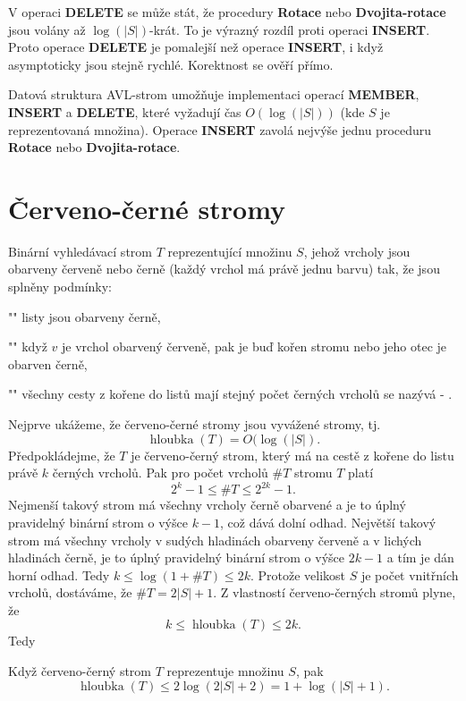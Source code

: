\documentclass[a4paper,12pt]{article}
\def \emph#1{\underbar{#1}}
\DeclareMathOperator*{\hloubka}{hloubka}
\begin{document}
V operaci {\bf DELETE} se může stát, že procedury 
{\bf Rotace} nebo {\bf Dvojita-rotace} jsou volány až $\log(
|S|)$-krát. 
To je výrazný rozdíl proti operaci {\bf INSERT}. Proto operace 
{\bf DELETE} je pomalejší než operace {\bf INSERT}, i když 
asymptoticky jsou stejně rychlé. Korektnost se 
ověří přímo.

Datová struktura AVL-strom 
umožňuje implementaci operací {\bf MEMBER}, {\bf INSERT} a 
{\bf DELETE}, které vyžadují čas $O(\log(|S|))$ (kde $
S$ je 
reprezentovaná množina).  Ope\-race {\bf INSERT} zavolá 
nejvýše jednu proceduru {\bf Rotace} nebo {\bf Dvo\-ji\-ta-rotace}.  
\endproclaim

\section{Červeno-černé stromy}

Binární vyhledávací strom $T$ reprezentující 
množinu $S$, jehož vrcholy jsou obarveny červeně nebo 
černě (každý vrchol má právě jednu barvu) tak, že jsou 
splněny podmínky:
\roster
\item"{}"
listy jsou obarveny černě,
\item"{}"
když $v$ je vrchol obarvený červeně, pak je buď kořen 
stromu nebo jeho otec je obarven černě,
\item"{}"
všechny cesty z kořene do listů mají stejný 
počet čer\-ných vrcholů
\endroster
se nazývá \emph{červeno}-\emph{černý} \emph{strom}. 

Nejprve ukážeme, že červeno-černé stromy jsou 
vyvážené stro\-my, tj. $$\hloubka(T)=O(\log(|S|).$$
Předpokládejme, že $T$ je červeno-černý strom, který má 
na cestě z kořene do listu právě $k$ černých 
vrcholů. Pak pro počet vrcholů $\#T$ 
stromu $T$ platí 
$$2^k-1\le \#T\le 2^{2k}-1.$$
Nejmenší takový strom má všechny vrcholy černě 
obarvené a je to úplný pravidelný binární strom o 
výšce $k-1$, což dává dolní odhad.  Největší takový 
strom má všechny vrcholy v sudých hladinách obarveny 
červeně a v lichých hladinách černě, je to úplný 
pravidelný binární strom o výšce $2k-1$ a tím je dán 
horní odhad. Tedy $k\le\log(1+\#T)\le 2k$.
Protože velikost $S$ je počet vnitřních vrcholů, 
dostáváme, že $\#T=2|S|+1$. Z vlastností červeno-černých 
stromů plyne, že 
$$k\le\hloubka(T)\le 2k.$$
Tedy

Když červeno-černý strom $T$ 
reprezentuje množinu $S$, pak $$\hloubka(T)\le 2\log(2|S|+2)=1+\log(|S|+1).$$
\endproclaim
\end{document}
